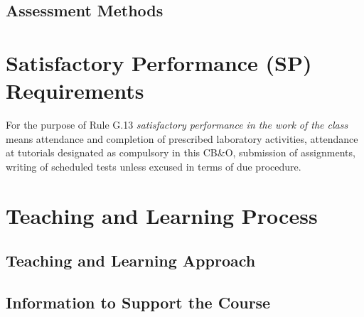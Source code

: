 \documentclass[11pt]{eie-cbo}
\begin{document}

\subsection{Assessment Methods}\label{methods}


\section{Satisfactory Performance (SP) Requirements}\label{SP}
For the purpose of Rule G.13 \emph{satisfactory performance in the work of the class} means attendance and completion of prescribed laboratory activities, attendance at tutorials designated as compulsory in this CB\&O, submission of assignments, writing of scheduled tests unless excused in terms of due procedure.


\section{Teaching and Learning Process}\label{teaching}

\subsection{Teaching and Learning Approach}

\subsection{Information to Support the Course}
\end{document}
